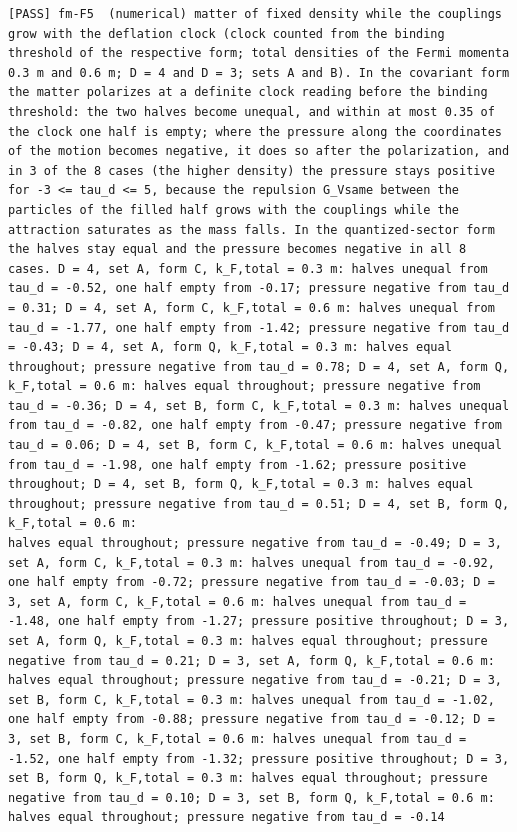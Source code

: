\documentclass[
  10pt,
]{article}
\begin{document}
\begin{verbatim}
[PASS] fm-F5  (numerical) matter of fixed density while the couplings grow with the deflation clock (clock counted from the binding threshold of the respective form; total densities of the Fermi momenta 0.3 m and 0.6 m; D = 4 and D = 3; sets A and B). In the covariant form the matter polarizes at a definite clock reading before the binding threshold: the two halves become unequal, and within at most 0.35 of the clock one half is empty; where the pressure along the coordinates of the motion becomes negative, it does so after the polarization, and in 3 of the 8 cases (the higher density) the pressure stays positive for -3 <= tau_d <= 5, because the repulsion G_Vsame between the particles of the filled half grows with the couplings while the attraction saturates as the mass falls. In the quantized-sector form the halves stay equal and the pressure becomes negative in all 8 cases. D = 4, set A, form C, k_F,total = 0.3 m: halves unequal from tau_d = -0.52, one half empty from -0.17; pressure negative from tau_d = 0.31; D = 4, set A, form C, k_F,total = 0.6 m: halves unequal from tau_d = -1.77, one half empty from -1.42; pressure negative from tau_d = -0.43; D = 4, set A, form Q, k_F,total = 0.3 m: halves equal throughout; pressure negative from tau_d = 0.78; D = 4, set A, form Q, k_F,total = 0.6 m: halves equal throughout; pressure negative from tau_d = -0.36; D = 4, set B, form C, k_F,total = 0.3 m: halves unequal from tau_d = -0.82, one half empty from -0.47; pressure negative from tau_d = 0.06; D = 4, set B, form C, k_F,total = 0.6 m: halves unequal from tau_d = -1.98, one half empty from -1.62; pressure positive throughout; D = 4, set B, form Q, k_F,total = 0.3 m: halves equal throughout; pressure negative from tau_d = 0.51; D = 4, set B, form Q, k_F,total = 0.6 m:
halves equal throughout; pressure negative from tau_d = -0.49; D = 3, set A, form C, k_F,total = 0.3 m: halves unequal from tau_d = -0.92, one half empty from -0.72; pressure negative from tau_d = -0.03; D = 3, set A, form C, k_F,total = 0.6 m: halves unequal from tau_d = -1.48, one half empty from -1.27; pressure positive throughout; D = 3, set A, form Q, k_F,total = 0.3 m: halves equal throughout; pressure negative from tau_d = 0.21; D = 3, set A, form Q, k_F,total = 0.6 m: halves equal throughout; pressure negative from tau_d = -0.21; D = 3, set B, form C, k_F,total = 0.3 m: halves unequal from tau_d = -1.02, one half empty from -0.88; pressure negative from tau_d = -0.12; D = 3, set B, form C, k_F,total = 0.6 m: halves unequal from tau_d = -1.52, one half empty from -1.32; pressure positive throughout; D = 3, set B, form Q, k_F,total = 0.3 m: halves equal throughout; pressure negative from tau_d = 0.10; D = 3, set B, form Q, k_F,total = 0.6 m: halves equal throughout; pressure negative from tau_d = -0.14

\end{verbatim}
\end{document}
